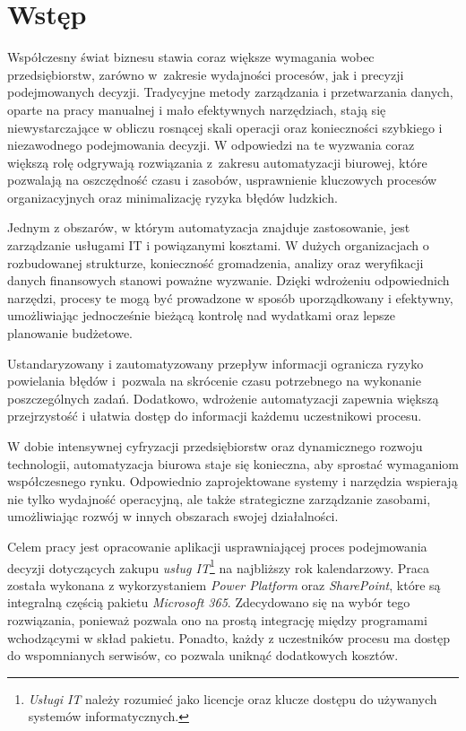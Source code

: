 \chapter{Wstęp}
Współczesny świat biznesu stawia coraz większe wymagania wobec przedsiębiorstw, zarówno w~zakresie wydajności procesów, jak i precyzji podejmowanych decyzji. Tradycyjne metody zarządzania i przetwarzania danych, oparte na pracy manualnej i mało efektywnych narzędziach, stają się niewystarczające w obliczu rosnącej skali operacji oraz konieczności szybkiego i niezawodnego podejmowania decyzji. W odpowiedzi na te wyzwania coraz większą rolę odgrywają rozwiązania z~zakresu automatyzacji biurowej, które pozwalają na oszczędność czasu i zasobów, usprawnienie kluczowych procesów organizacyjnych oraz minimalizację ryzyka błędów ludzkich.
\par Jednym z obszarów, w którym automatyzacja znajduje zastosowanie, jest zarządzanie usługami IT i powiązanymi kosztami. W dużych organizacjach o rozbudowanej strukturze, konieczność gromadzenia, analizy oraz weryfikacji danych finansowych stanowi poważne wyzwanie. Dzięki wdrożeniu odpowiednich narzędzi, procesy te mogą być prowadzone w sposób uporządkowany i efektywny, umożliwiając jednocześnie bieżącą kontrolę nad wydatkami oraz lepsze planowanie budżetowe.
\par   Ustandaryzowany i zautomatyzowany przepływ informacji ogranicza ryzyko powielania błędów i~pozwala na skrócenie czasu potrzebnego na wykonanie poszczególnych zadań. Dodatkowo, wdrożenie automatyzacji zapewnia większą przejrzystość i ułatwia dostęp do informacji każdemu uczestnikowi procesu.
\par W dobie intensywnej cyfryzacji przedsiębiorstw oraz dynamicznego rozwoju technologii, automatyzacja biurowa staje się konieczna, aby sprostać wymaganiom współczesnego rynku. Odpowiednio zaprojektowane systemy i narzędzia wspierają nie tylko wydajność operacyjną, ale także strategiczne zarządzanie zasobami, umożliwiając rozwój w innych obszarach swojej działalności.
\vspace{1cm}
\par Celem pracy jest opracowanie aplikacji usprawniającej proces podejmowania decyzji dotyczących zakupu \emph{usług IT}\footnote{\emph{Usługi IT}  należy rozumieć jako licencje oraz klucze dostępu do używanych systemów informatycznych.} na najbliższy rok kalendarzowy. Praca została wykonana z wykorzystaniem \emph{Power Platform} oraz \emph{SharePoint}, które są integralną częścią pakietu \emph{Microsoft 365}. Zdecydowano się na wybór tego rozwiązania, ponieważ pozwala ono na prostą integrację między programami wchodzącymi w skład pakietu. Ponadto, każdy z uczestników procesu ma dostęp do wspomnianych serwisów, co pozwala uniknąć dodatkowych kosztów.

